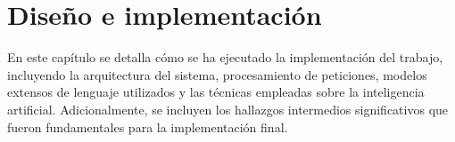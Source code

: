 \chapter{Diseño e implementación} %
\label{Chapter3} %
En este capítulo se detalla cómo se ha ejecutado la implementación del trabajo,
incluyendo la arquitectura del sistema, procesamiento de peticiones,
modelos extensos de lenguaje utilizados y las técnicas empleadas sobre la inteligencia artificial.
Adicionalmente, se incluyen los hallazgos intermedios significativos que fueron fundamentales para la implementación final.


